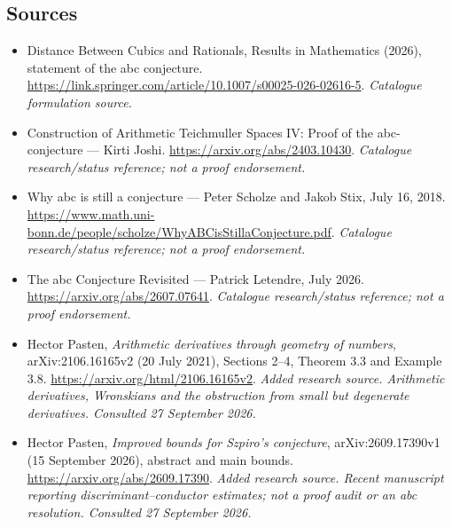 \documentclass[11pt,a4paper]{article}
\begin{document}
\subsection{Sources}
\begin{itemize}\raggedright
\item[\textnormal{[S1]}]\hypertarget{source:statement:1}{} Distance Between Cubics and Rationals, Results in Mathematics (2026), statement of the abc conjecture.
\url{https://link.springer.com/article/10.1007/s00025-026-02616-5}.
{\small\textit{Catalogue formulation source.}}
\item[\textnormal{[S2]}]\hypertarget{source:statement:2}{} Construction of Arithmetic Teichmuller Spaces IV: Proof of the abc-conjecture — Kirti Joshi.
\url{https://arxiv.org/abs/2403.10430}.
{\small\textit{Catalogue research/status reference; not a proof endorsement.}}
\item[\textnormal{[S3]}]\hypertarget{source:statement:3}{} Why abc is still a conjecture — Peter Scholze and Jakob Stix, July 16, 2018.
\url{https://www.math.uni-bonn.de/people/scholze/WhyABCisStillaConjecture.pdf}.
{\small\textit{Catalogue research/status reference; not a proof endorsement.}}
\item[\textnormal{[S4]}]\hypertarget{source:statement:4}{} The abc Conjecture Revisited — Patrick Letendre, July 2026.
\url{https://arxiv.org/abs/2607.07641}.
{\small\textit{Catalogue research/status reference; not a proof endorsement.}}
\item[\textnormal{[E1]}]\hypertarget{extra:statement:1}{} Hector Pasten, \emph{Arithmetic derivatives through geometry of numbers}, arXiv:2106.16165v2 (20 July 2021), Sections 2--4, Theorem 3.3 and Example 3.8.
\url{https://arxiv.org/html/2106.16165v2}.
{\small\textit{Added research source. Arithmetic derivatives, Wronskians and the obstruction from small but degenerate derivatives. Consulted 27 September 2026.}}
\item[\textnormal{[E2]}]\hypertarget{extra:statement:2}{} Hector Pasten, \emph{Improved bounds for Szpiro's conjecture}, arXiv:2609.17390v1 (15 September 2026), abstract and main bounds.
\url{https://arxiv.org/abs/2609.17390}.
{\small\textit{Added research source. Recent manuscript reporting discriminant--conductor estimates; not a proof audit or an abc resolution. Consulted 27 September 2026.}}
\end{itemize}

\end{document}
